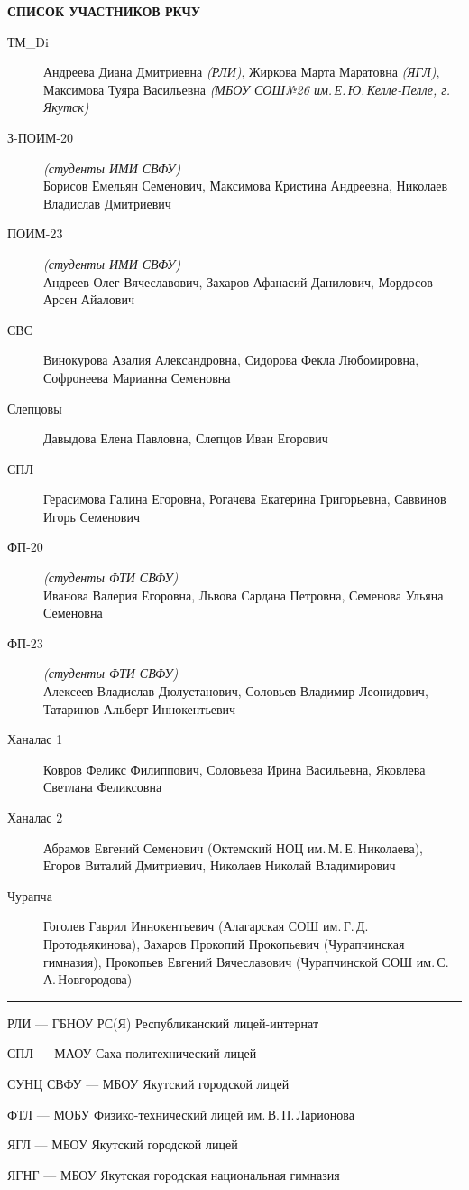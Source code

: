 \newpage
\noindent
\textbf{СПИСОК УЧАСТНИКОВ РКЧУ}
\begin{description}

\item[ТМ\_Di]
Андреева Диана Дмитриевна \textit{(РЛИ)},
Жиркова Марта Маратовна \textit{(ЯГЛ)},
Максимова Туяра Васильевна \textit{(МБОУ СОШ№26 им.\,Е.\,Ю.\,Келле-Пелле, г. Якутск)}

\item[З-ПОИМ-20] \textit{(студенты ИМИ СВФУ)} \\
Борисов Емельян Семенович, Максимова Кристина Андреевна, Николаев Владислав Дмитриевич

\item[ПОИМ-23] \textit{(студенты ИМИ СВФУ)} \\
Андреев Олег Вячеславович, Захаров Афанасий Данилович, Мордосов Арсен Айалович

\item[СВС]
Винокурова Азалия Александровна, Сидорова Фекла Любомировна, Софронеева Марианна Семеновна

\item[Слепцовы]
Давыдова Елена Павловна, Слепцов Иван Егорович

\item[СПЛ]
Герасимова Галина Егоровна, Рогачева Екатерина Григорьевна, Саввинов Игорь Семенович

\item[ФП-20] \textit{(студенты ФТИ СВФУ)} \\
Иванова Валерия Егоровна, Львова Сардана Петровна, Семенова Ульяна Семеновна

\item[ФП-23] \textit{(студенты ФТИ СВФУ)} \\
Алексеев Владислав Дюлустанович, Соловьев Владимир Леонидович, Татаринов Альберт Иннокентьевич

\item[Ханалас 1]
Ковров Феликс Филиппович,
Соловьева Ирина Васильевна,
Яковлева Светлана Феликсовна

\item[Ханалас 2]
Абрамов Евгений Семенович (Октемский НОЦ им.\,М.\,Е.\,Николаева),
Егоров Виталий Дмитриевич,
Николаев Николай Владимирович

\item[Чурапча]
Гоголев Гаврил Иннокентьевич (Алагарская СОШ им.\,Г.\,Д.\,Протодьякинова),
Захаров Прокопий Прокопьевич (Чурапчинская гимназия),
Прокопьев Евгений Вячеславович (Чурапчинской СОШ им.\,С.\,А.\,Новгородова)

\end{description}

\noindent\rule{3cm}{0.4pt}

\noindent РЛИ --- ГБНОУ РС(Я) Республиканский лицей-интернат

\noindent СПЛ --- МАОУ Саха политехнический лицей

\noindent СУНЦ СВФУ --- МБОУ Якутский городской лицей

\noindent ФТЛ --- МОБУ Физико-технический лицей им.\,В.\,П.\,Ларионова

\noindent ЯГЛ --- МБОУ Якутский городской лицей

\noindent ЯГНГ --- МБОУ Якутская городская национальная гимназия
